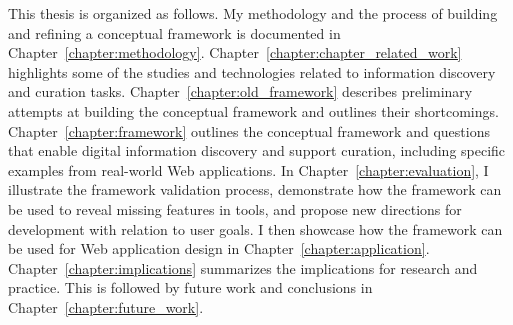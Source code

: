 This thesis is organized as follows. My methodology and the process of building and refining a conceptual framework is documented in Chapter~\ref{chapter:methodology}. Chapter~\ref{chapter:chapter_related_work} highlights some of the studies and technologies related to information discovery and curation tasks. Chapter~\ref{chapter:old_framework} describes preliminary attempts at building the conceptual framework and outlines their shortcomings. Chapter~\ref{chapter:framework} outlines the conceptual framework and questions that enable digital information discovery and support curation, including specific examples from real-world Web applications. In Chapter~\ref{chapter:evaluation}, I illustrate the framework validation process, demonstrate how the framework can be used to reveal missing features in tools, and propose new directions for development with relation to user goals. I then showcase how the framework can be used for Web application design in Chapter~\ref{chapter:application}. Chapter~\ref{chapter:implications} summarizes the implications for research and practice. This is followed by future work and conclusions in Chapter~\ref{chapter:future_work}.




